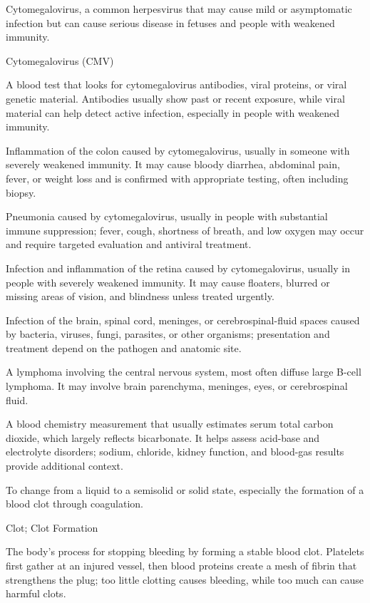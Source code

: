  Cytomegalovirus, a common herpesvirus that may cause mild or asymptomatic infection but can cause serious disease in fetuses and people with
weakened immunity.

\synonyms
Cytomegalovirus (CMV)

 A blood test that looks for cytomegalovirus antibodies, viral proteins, or viral genetic material. Antibodies usually show past or recent exposure, while viral material can help detect active infection, especially in people with weakened immunity.

 Inflammation of the colon caused by cytomegalovirus, usually in someone with severely weakened immunity. It may cause bloody diarrhea, abdominal pain, fever, or weight loss and is confirmed with appropriate testing, often including biopsy.

 Pneumonia caused by cytomegalovirus, usually in people with substantial immune suppression; fever, cough, shortness of breath, and low oxygen may occur and require targeted evaluation and antiviral treatment.

 Infection and inflammation of the retina caused by cytomegalovirus, usually in people with severely weakened immunity. It may cause floaters, blurred or missing areas of vision, and blindness unless treated urgently.

 Infection of the brain, spinal cord, meninges, or cerebrospinal-fluid spaces caused by bacteria, viruses, fungi, parasites, or other organisms; presentation and treatment depend on the pathogen and anatomic site.

 A lymphoma involving the central nervous system, most often diffuse large B-cell lymphoma. It may involve brain parenchyma, meninges, eyes, or cerebrospinal fluid.

 A blood chemistry measurement that usually estimates serum total carbon dioxide, which largely reflects bicarbonate. It helps assess acid-base and electrolyte disorders; sodium, chloride, kidney function, and blood-gas results provide additional context.

 To change from a liquid to a semisolid or solid state, especially the formation of a blood clot through coagulation.

\synonyms
Clot; Clot Formation

 The body's process for stopping bleeding by forming a stable blood clot. Platelets first gather at an injured vessel, then blood proteins create a mesh of fibrin that strengthens the plug; too little clotting causes bleeding, while too much can cause harmful clots.

